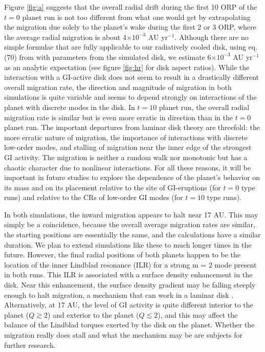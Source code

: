 \documentclass[12pt,manuscript,authoryear]{aastex}
\begin{document}
Figure \ref{fig:a} suggests that the overall radial drift during the first 10 ORP of the $t = 0$ planet run is not too
different from what one would get by extrapolating the migration due solely to the planet's wake during the first 2 or 3
ORP, where the average radial migration is about 4$\times10^{-3}$ AU yr$^{-1}$. Although there are no simple formulae
that are fully applicable to our radiatively cooled disk, using eq. (70) from \citet{tanaka2002} with parameters from
the simulated disk, we estimate 6$\times10^{-3}$ AU yr$^{-1}$ as an analytic expectation (see figure \ref{fig:hr} for
disk aspect ratios). While the interaction with a GI-active disk does not seem to result in a drastically different
overall migration rate, the direction and magnitude of migration in both simulations is quite variable and seems to
depend strongly on interactions of the planet with discrete modes in the disk. In $t = 10$ planet run, the overall
radial migration rate is similar but is even more erratic in direction than in the $t = 0$ planet run. The important
departures from laminar disk theory are threefold: the more erratic nature of migration, the importance of interactions
with discrete low-order modes, and stalling of migration near the inner edge of the strongest GI activity. The migration
is neither a random walk nor monotonic but has a chaotic character due to nonlinear interactions. For all these reasons,
it will be important in future studies to explore the dependence of the planet's behavior on its mass and on its
placement relative to the site of GI-eruptions (for $t = 0$ type runs) and relative to the CRs of low-order GI modes
(for $t = 10$ type runs).

In both simulations, the inward migration appears to halt near 17 AU. This may simply be a coincidence, because the
overall average migration rates are similar, the starting positions are essentially the same, and the calculations have
a similar duration. We plan to extend simulations like these to much longer times in the future. However, the final
radial positions of both planets happen to be the location of the inner Lindblad resonance (ILR) for a strong m = 2 mode
present in both runs. This ILR is associated with a surface density enhancement in the disk. Near this enhancement, the
surface density gradient may be falling steeply enough to halt migration, a mechanism that can work in a laminar disk
\citep{paardekooper2009}.  Alternatively, at 17 AU, the level of GI activity is quite different interior to the planet
($Q \gtrsim 2$) and exterior to the planet ($Q \lesssim 2$), and this may affect the balance of the Lindblad torques
exerted by the disk on the planet. Whether the migration really does stall and what the mechanism may be are subjects
for further research.
\end{document}
